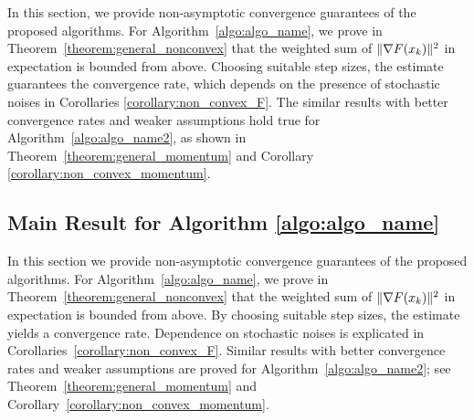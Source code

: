 

In this section, we provide non-asymptotic convergence guarantees of the proposed algorithms. For Algorithm~\ref{algo:algo_name}, we prove in  Theorem~\ref{theorem:general_nonconvex} that the weighted sum of $\|\nabla F(x_k)\|^2$ in expectation is bounded from above. Choosing suitable step sizes, the estimate guarantees the convergence rate, which depends on the presence of stochastic noises in Corollaries \ref{corollary:non_convex_F}. The similar results with better convergence rates and weaker assumptions hold true for Algorithm~\ref{algo:algo_name2}, as shown in Theorem~\ref{theorem:general_momentum}
and Corollary \ref{corollary:non_convex_momentum}.

















\subsection{Main Result for Algorithm \ref{algo:algo_name}}

In this section we provide non-asymptotic convergence guarantees of the proposed algorithms. 
For Algorithm~\ref{algo:algo_name}, we prove in  Theorem~\ref{theorem:general_nonconvex} that the weighted sum of $\|\nabla F(x_k)\|^2$ in expectation is bounded from above. 
By choosing suitable step sizes, the estimate yields a convergence rate.
Dependence on stochastic noises is explicated in Corollaries~\ref{corollary:non_convex_F}. 
Similar results with better convergence rates and weaker assumptions are proved for Algorithm~\ref{algo:algo_name2}; see Theorem~\ref{theorem:general_momentum}
and Corollary~\ref{corollary:non_convex_momentum}.

